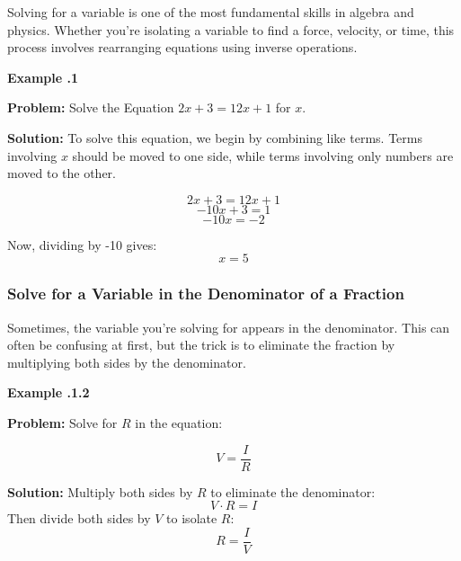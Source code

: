 Solving for a variable is one of the most fundamental skills in algebra and physics. Whether you're isolating a variable to find a force, velocity, or time, this process involves rearranging equations using inverse operations.



\begin{mdframed}[backgroundcolor=blue!10!white]
	\begin{center}
		
		
		\textbf{Example \thesection.1}	
	\end{center}
	
	\textbf{Problem:} Solve the Equation \color{blue}$2x+3 = 12x +1$  \color{black} for \color{blue}$x$\color{black}.
	\vspace{0.1in}
	
	\textbf{Solution:} To solve this equation, we begin by combining like terms.  Terms involving \color{blue}$x $ \color{black} should be moved to one side, while terms involving only numbers are moved to the other.  
	\color{blue}
	
	\begin{equation*}
		2x + 3 = 12 x +1
	\end{equation*}
	\begin{equation*}
	-10x +3  = 1
\end{equation*}
	\begin{equation*}
	-10x = -2
\end{equation*}
\color{black}


Now, dividing by -10 gives: 
	\color{blue}
	\begin{equation*}
	x = 5
\end{equation*}	
	\color{black}
\end{mdframed}
\newpage

\subsubsection{Solve for a Variable in the Denominator of a Fraction}

Sometimes, the variable you're solving for appears in the denominator. This can often be confusing at first, but the trick is to eliminate the fraction by multiplying both sides by the denominator.

\begin{mdframed}[backgroundcolor=blue!10!white]
	\begin{center}
	
	
	\textbf{Example \thesection.1.2}	
\end{center}

\textbf{Problem:} Solve for \( R \) in the equation:

	\begin{equation*}
			V = \frac{I}{R}
	\end{equation*}

	


\textbf{Solution:} Multiply both sides by \( R \) to eliminate the denominator:
\[
V \cdot R = I
\]
Then divide both sides by \( V \) to isolate \( R \):
\[
R = \frac{I}{V}
\]

\end{mdframed}

